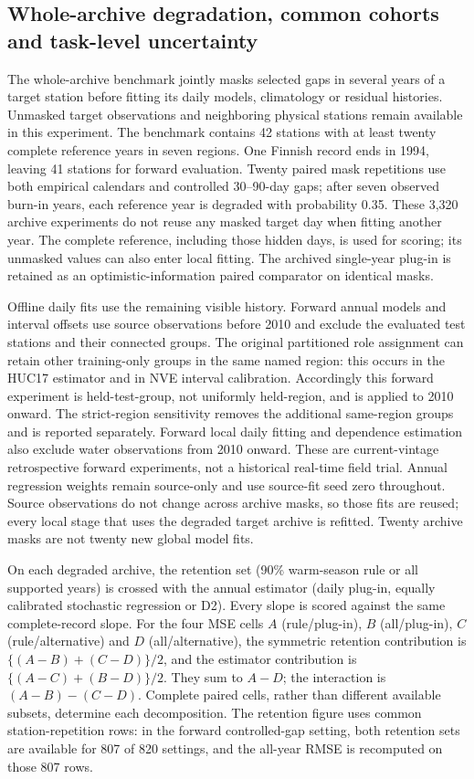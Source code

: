 \subsection{Whole-archive degradation, common cohorts and task-level uncertainty}
The whole-archive benchmark jointly masks selected gaps in several years of a target station before fitting its daily models, climatology or residual histories. Unmasked target observations and neighboring physical stations remain available in this experiment. The benchmark contains 42 stations with at least twenty complete reference years in seven regions. One Finnish record ends in 1994, leaving 41 stations for forward evaluation. Twenty paired mask repetitions use both empirical calendars and controlled 30--90-day gaps; after seven observed burn-in years, each reference year is degraded with probability 0.35. These 3,320 archive experiments do not reuse any masked target day when fitting another year. The complete reference, including those hidden days, is used for scoring; its unmasked values can also enter local fitting. The archived single-year plug-in is retained as an optimistic-information paired comparator on identical masks.

Offline daily fits use the remaining visible history. Forward annual models and interval offsets use source observations before 2010 and exclude the evaluated test stations and their connected groups. The original partitioned role assignment can retain other training-only groups in the same named region: this occurs in the HUC17 estimator and in NVE interval calibration. Accordingly this forward experiment is held-test-group, not uniformly held-region, and is applied to 2010 onward. The strict-region sensitivity removes the additional same-region groups and is reported separately. Forward local daily fitting and dependence estimation also exclude water observations from 2010 onward. These are current-vintage retrospective forward experiments, not a historical real-time field trial. Annual regression weights remain source-only and use source-fit seed zero throughout. Source observations do not change across archive masks, so those fits are reused; every local stage that uses the degraded target archive is refitted. Twenty archive masks are not twenty new global model fits.

On each degraded archive, the retention set (90\% warm-season rule or all supported years) is crossed with the annual estimator (daily plug-in, equally calibrated stochastic regression or D2). Every slope is scored against the same complete-record slope. For the four MSE cells $A$ (rule/plug-in), $B$ (all/plug-in), $C$ (rule/alternative) and $D$ (all/alternative), the symmetric retention contribution is $\{(A-B)+(C-D)\}/2$, and the estimator contribution is $\{(A-C)+(B-D)\}/2$. They sum to $A-D$; the interaction is $(A-B)-(C-D)$. Complete paired cells, rather than different available subsets, determine each decomposition. The retention figure uses common station-repetition rows: in the forward controlled-gap setting, both retention sets are available for 807 of 820 settings, and the all-year RMSE is recomputed on those 807 rows.


